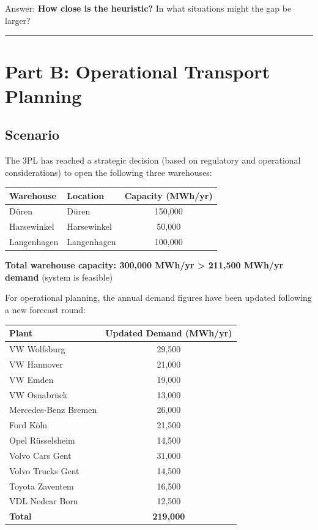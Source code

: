 \documentclass[
  a4paper,
]{article}
\begin{document}
Answer: \textbf{How close is the heuristic?} In what situations might
the gap be larger?

\begin{center}\rule{0.5\linewidth}{0.5pt}\end{center}

\section{Part B: Operational Transport
Planning}\label{part-b-operational-transport-planning}

\subsection{Scenario}\label{scenario}

The 3PL has reached a strategic decision (based on regulatory and
operational considerations) to open the following three warehouses:

\begin{longtable}[]{@{}llc@{}}
\toprule\noalign{}
Warehouse & Location & Capacity (MWh/yr) \\
\midrule\noalign{}
\endhead
\bottomrule\noalign{}
\endlastfoot
Düren & Düren & 150,000 \\
Harsewinkel & Harsewinkel & 50,000 \\
Langenhagen & Langenhagen & 100,000 \\
\end{longtable}

\textbf{Total warehouse capacity: 300,000 MWh/yr \textgreater{} 211,500
MWh/yr demand} (system is feasible)

For operational planning, the annual demand figures have been updated
following a new forecast round:

\begin{longtable}[]{@{}lc@{}}
\toprule\noalign{}
Plant & Updated Demand (MWh/yr) \\
\midrule\noalign{}
\endhead
\bottomrule\noalign{}
\endlastfoot
VW Wolfsburg & 29,500 \\
VW Hannover & 21,000 \\
VW Emden & 19,000 \\
VW Osnabrück & 13,000 \\
Mercedes-Benz Bremen & 26,000 \\
Ford Köln & 21,500 \\
Opel Rüsselsheim & 14,500 \\
Volvo Cars Gent & 31,000 \\
Volvo Trucks Gent & 14,500 \\
Toyota Zaventem & 16,500 \\
VDL Nedcar Born & 12,500 \\
\textbf{Total} & \textbf{219,000} \\
\end{longtable}
\end{document}
